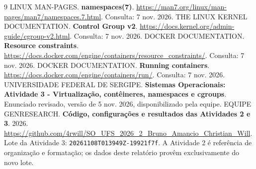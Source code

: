 \documentclass[12pt,a4paper]{article}
\newcommand{\lotecoleta}{\texttt{20261108T013949Z-19921f7f}}
\begin{document}
\begingroup
\renewcommand{\section}[2]{}
\begin{singlespace}\footnotesize
\begin{thebibliography}{9}
 LINUX MAN-PAGES. \textbf{namespaces(7)}. \url{https://man7.org/linux/man-pages/man7/namespaces.7.html}. Consulta: 7 nov. 2026.
 THE LINUX KERNEL DOCUMENTATION. \textbf{Control Group v2}. \url{https://docs.kernel.org/admin-guide/cgroup-v2.html}. Consulta: 7 nov. 2026.
 DOCKER DOCUMENTATION. \textbf{Resource constraints}. \url{https://docs.docker.com/engine/containers/resource_constraints/}. Consulta: 7 nov. 2026.
 DOCKER DOCUMENTATION. \textbf{Running containers}. \url{https://docs.docker.com/engine/containers/run/}. Consulta: 7 nov. 2026.
 UNIVERSIDADE FEDERAL DE SERGIPE. \textbf{Sistemas Operacionais: Atividade 3 - Virtualização, contêineres, namespaces e cgroups}. Enunciado revisado, versão de 5 nov. 2026, disponibilizado pela equipe.
 EQUIPE GENRESEARCH. \textbf{Código, configurações e resultados das Atividades 2 e 3}. 2026. \url{https://github.com/4rwill/SO_UFS_2026_2_Bruno_Amancio_Christian_Will}. Lote da Atividade 3: \lotecoleta. A Atividade 2 é referência de organização e formatação; os dados deste relatório provêm exclusivamente do novo lote.
\end{thebibliography}\end{singlespace}
\endgroup
\end{document}
